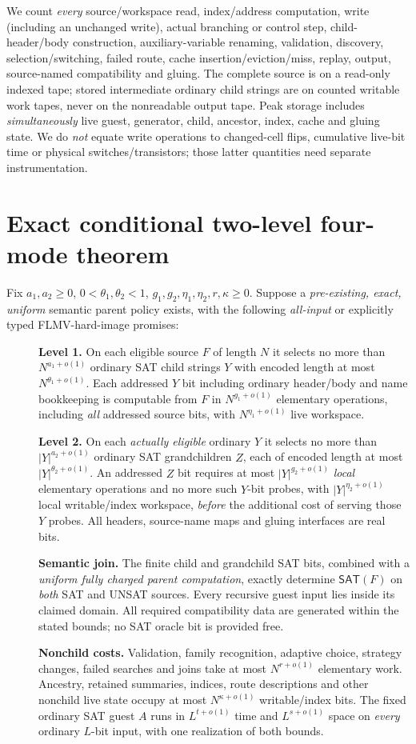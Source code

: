 \documentclass[11pt]{article}
\newcommand{\SAT}{\mathsf{SAT}}
\begin{document}
We count \emph{every} source/workspace read, index/address computation,
write (including an unchanged write), actual branching or control step,
child-header/body construction, auxiliary-variable renaming,
validation, discovery, selection/switching, failed route, cache
insertion/eviction/miss, replay, output, source-named compatibility
and gluing. The complete source is on a read-only indexed tape;
stored intermediate ordinary child strings are on counted writable
work tapes, never on the nonreadable output tape.
Peak storage includes \emph{simultaneously} live guest, generator,
child, ancestor, index, cache and gluing state.
We do \emph{not} equate write operations to changed-cell flips,
cumulative live-bit time or physical switches/transistors; those
latter quantities need separate instrumentation.

\section*{Exact conditional two-level four-mode theorem}
Fix $a_1,a_2\ge0$, $0<\theta_1,\theta_2<1$,
$g_1,g_2,\eta_1,\eta_2,r,\kappa\ge0$.
Suppose a \emph{pre-existing, exact, uniform} semantic parent policy
exists, with the following \emph{all-input} or explicitly typed
FLMV-hard-image promises:
\begin{description}
\item[] \textbf{Level 1.} On each eligible source $F$ of length $N$ it
selects no more than $N^{a_1+o(1)}$ ordinary SAT child strings
$Y$ with encoded length at most $N^{\theta_1+o(1)}$.
Each addressed $Y$ bit including ordinary header/body and
name bookkeeping is computable from $F$ in
$N^{g_1+o(1)}$ elementary operations, including \emph{all}
addressed source bits, with $N^{\eta_1+o(1)}$ live workspace.
\item[] \textbf{Level 2.} On each \emph{actually eligible}
ordinary $Y$ it selects no more than
$|Y|^{a_2+o(1)}$ ordinary SAT grandchildren $Z$,
each of encoded length at most $|Y|^{\theta_2+o(1)}$.
An addressed $Z$ bit requires at most
$|Y|^{g_2+o(1)}$ \emph{local} elementary
operations and no more such $Y$-bit probes, with
$|Y|^{\eta_2+o(1)}$ local writable/index workspace,
\emph{before} the additional cost of serving those $Y$ probes.
All headers, source-name maps and gluing interfaces are real bits.
\item[] \textbf{Semantic join.} The finite child and grandchild SAT bits,
combined with a \emph{uniform fully charged parent computation},
exactly determine $\SAT(F)$ on \emph{both} SAT and UNSAT sources.
Every recursive guest input lies inside its claimed domain.
All required compatibility data are generated within the stated
bounds; no SAT oracle bit is provided free.
\item[] \textbf{Nonchild costs.} Validation, family recognition,
adaptive choice, strategy changes, failed searches and
joins take at most $N^{r+o(1)}$ elementary work.
Ancestry, retained summaries, indices, route descriptions and
other nonchild live state occupy at most $N^{\kappa+o(1)}$
writable/index bits. The fixed ordinary SAT guest $A$ runs in
$L^{t+o(1)}$ time and $L^{s+o(1)}$ space on \emph{every}
ordinary $L$-bit input, with one realization of both bounds.
\end{description}
\end{document}
